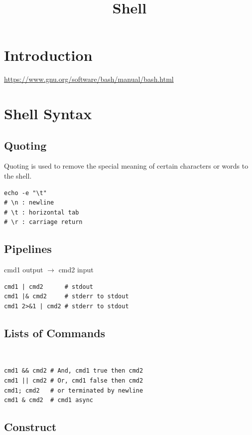 \documentclass{blog}
\title{Shell}
\begin{document}
\maketitle
\tableofcontents
\section{Introduction}
\url{https://www.gnu.org/software/bash/manual/bash.html}

\section{Shell Syntax}
\subsection{Quoting}
\begin{definition}[quoting]
    Quoting is used to remove the special meaning of certain characters or words to the shell.
    \begin{verbatim}
echo -e "\t"
# \n : newline
# \t : horizontal tab
# \r : carriage return
\end{verbatim}
\end{definition}

\subsection{Pipelines}
\begin{definition}[pipeline]
    cmd1 output $\to$ cmd2 input
    \begin{verbatim}
cmd1 | cmd2      # stdout
cmd1 |& cmd2     # stderr to stdout
cmd1 2>&1 | cmd2 # stderr to stdout
\end{verbatim}
\end{definition}

\subsection{Lists of Commands}
\begin{definition}[list]~
    \begin{verbatim}
cmd1 && cmd2 # And, cmd1 true then cmd2
cmd1 || cmd2 # Or, cmd1 false then cmd2
cmd1; cmd2   # or terminated by newline
cmd1 & cmd2  # cmd1 async
\end{verbatim}
\end{definition}

\subsection{Construct}
\end{document}
